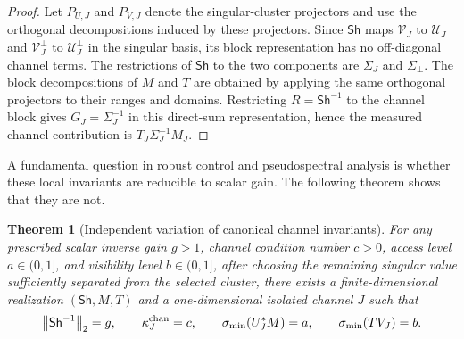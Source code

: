 \documentclass[review]{siamart220329}
\newtheorem{theorem}{Theorem}[section]
\theoremstyle{definition}
\theoremstyle{remark}
\newcommand{\calU}{\mathcal{U}}
\newcommand{\calV}{\mathcal{V}}
\newcommand{\Sh}{\mathsf{Sh}}
\newcommand{\smin}{\sigma_{\min}}
\newcommand{\norm}[1]{\left\lVert #1\right\rVert}
\begin{document}
\begin{proof}
Let $P_{U,J}$ and $P_{V,J}$ denote the singular-cluster projectors and use the
orthogonal decompositions induced by these projectors. Since $\Sh$ maps
$\calV_J$ to $\calU_J$ and $\calV_J^\perp$ to $\calU_J^\perp$ in the singular
basis, its block representation has no off-diagonal channel terms. The
restrictions of $\Sh$ to the two components are $\Sigma_J$ and $\Sigma_\perp$.
The block decompositions of $M$ and $T$ are obtained by applying the same
orthogonal projectors to their ranges and domains. Restricting $R=\Sh^{-1}$ to
the channel block gives $G_J=\Sigma_J^{-1}$ in this direct-sum representation,
hence the measured channel contribution is $T_J\Sigma_J^{-1}M_J$.
\end{proof}

A fundamental question in robust control and pseudospectral analysis is whether
these local invariants are reducible to scalar gain. The following theorem shows
that they are not.

\begin{theorem}[Independent variation of canonical channel invariants]
\label{thm:complete-separation}
For any prescribed scalar inverse gain $g>1$, channel condition number $c>0$,
access level $a\in(0,1]$, and visibility level $b\in(0,1]$, after choosing the
remaining singular value sufficiently separated from the selected cluster, there
exists a finite-dimensional realization $(\Sh,M,T)$ and a one-dimensional
isolated channel $J$ such that
\begin{equation}
    \norm{\Sh^{-1}}_2=g,\qquad
    \kappa_J^{\rm chan}=c,\qquad
    \smin(U_J^*M)=a,\qquad
    \smin(TV_J)=b.
\end{equation}
\end{theorem}
\end{document}
